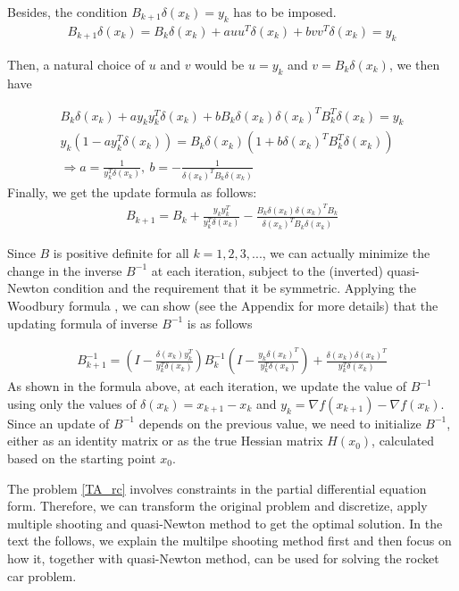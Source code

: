 Besides, the condition $B_{k+1}\delta(x_k) = y_k$ has to be imposed.
\begin{align*}
	B_{k+1}\delta(x_k) = B_k\delta(x_k)  + a u u^T\delta(x_k) + b v v^T\delta(x_k) = y_k
\end{align*}

Then, a natural choice of $u$ and $v$ would be $u=y_k$ and $v=B_k\delta(x_k)$, we then have

\begin{align*}
	B_k\delta(x_k) + a y_ky^T_k\delta(x_k) + bB_k\delta(x_k) \delta(x_k)^TB_k^T\delta(x_k) = y_k  \\
	y_k(1-ay_k^T\delta(x_k) ) = B_k\delta(x_k)(1+ b \delta(x_k)^TB_k^T\delta(x_k)) \\
	\Rightarrow a = \frac{1}{y_k^T\delta(x_k)}, \  b= - \frac{1}{\delta(x_k)^TB_k\delta(x_k)}
\end{align*}
Finally, we get the update formula as follows: 
\begin{align*}
	B_{k+1} = B_k +  \frac{y_ky_k^T}{y_k^T\delta(x_k)}  - \frac{B_k\delta(x_k)\delta(x_k)^TB_k}{\delta(x_k)^TB_k\delta(x_k)}
\end{align*}

Since $B$ is positive definite for all $k = 1,2, 3, ...$, we can actually minimize the change in the inverse $B^{-1}$ at each iteration, subject to the (inverted) quasi-Newton condition and the requirement that it be symmetric. Applying the Woodbury formula , we can show (see the Appendix for more details) that the updating formula of inverse $B^{-1}$ is as follows

\begin{align*}
	B_{k+1}^{-1} = (I - \frac{\delta(x_k)y_k^T}{y_k^T\delta(x_k)})B_k^{-1}(I - \frac{y_k\delta(x_k)^T}{y_k^T\delta(x_k)}) +  \frac{\delta(x_k)\delta(x_k)^T}{y_k^T\delta(x_k)} 
\end{align*}
As shown in the formula above, at each iteration, we update the value of $B^{-1}$ using only the values of $\delta(x_k) = x_{k+1} -x_k$ and $y_k = \nabla f(x_{k+1}) - \nabla f(x_k)$. Since an update of $B^{-1}$ depends on the previous value, we need to initialize $B^{-1}$, either as an identity matrix or as the true Hessian matrix $H(x_0)$, calculated based on the starting point $x_0$.

The problem \ref{TA_rc} involves constraints in the partial differential equation form. Therefore, we can transform the original problem and discretize, apply multiple shooting and quasi-Newton method to get the optimal solution. In the text the follows, we explain the multilpe shooting method first and then focus on how it, together with quasi-Newton method, can be used for solving the rocket car problem.  


